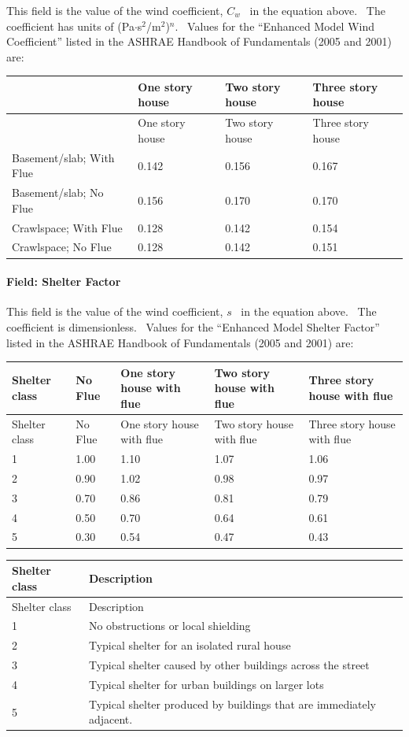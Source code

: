 This field is the value of the wind coefficient, \({C_w}\) ~in the equation above.~ The coefficient has units of (Pa$\cdot$s\(^{2}\)/m\(^{2}\))\(^{n}\).~ Values for the ``Enhanced Model Wind Coefficient'' listed in the ASHRAE Handbook of Fundamentals (2005 and 2001) are:

\begin{longtable}[c]{p{1.5in}p{1.5in}p{1.5in}p{1.5in}}
\toprule
~ & One story house & Two story house & Three story house \tabularnewline
\midrule
\endfirsthead

\toprule
~ & One story house & Two story house & Three story house \tabularnewline
\midrule
\endhead

Basement/slab; With Flue & 0.142 & 0.156 & 0.167 \tabularnewline
Basement/slab; No Flue & 0.156 & 0.170 & 0.170 \tabularnewline
Crawlspace; With Flue & 0.128 & 0.142 & 0.154 \tabularnewline
Crawlspace; No Flue & 0.128 & 0.142 & 0.151 \tabularnewline
\bottomrule
\end{longtable}

\paragraph{Field: Shelter Factor}\label{field-shelter-factor}

This field is the value of the wind coefficient, \(s\) ~in the equation above.~ The coefficient is dimensionless.~ Values for the ``Enhanced Model Shelter Factor'' listed in the ASHRAE Handbook of Fundamentals (2005 and 2001) are:

\begin{longtable}[c]{@{}lllll@{}}
\toprule
Shelter class & No Flue & One story house with flue & Two story house with flue & Three story house with flue \tabularnewline
\midrule
\endfirsthead

\toprule
Shelter class & No Flue & One story house with flue & Two story house with flue & Three story house with flue \tabularnewline
\midrule
\endhead

1 & 1.00 & 1.10 & 1.07 & 1.06 \tabularnewline
2 & 0.90 & 1.02 & 0.98 & 0.97 \tabularnewline
3 & 0.70 & 0.86 & 0.81 & 0.79 \tabularnewline
4 & 0.50 & 0.70 & 0.64 & 0.61 \tabularnewline
5 & 0.30 & 0.54 & 0.47 & 0.43 \tabularnewline
\bottomrule
\end{longtable}

\begin{longtable}[c]{p{1.5in}p{4.5in}}
\toprule
Shelter class & Description \tabularnewline
\midrule
\endfirsthead

\toprule
Shelter class & Description \tabularnewline
\midrule
\endhead

1 & No obstructions or local shielding \tabularnewline
2 & Typical shelter for an isolated rural house \tabularnewline
3 & Typical shelter caused by other buildings across the street \tabularnewline
4 & Typical shelter for urban buildings on larger lots \tabularnewline
5 & Typical shelter produced by buildings that are immediately adjacent. \tabularnewline
\bottomrule
\end{longtable}

